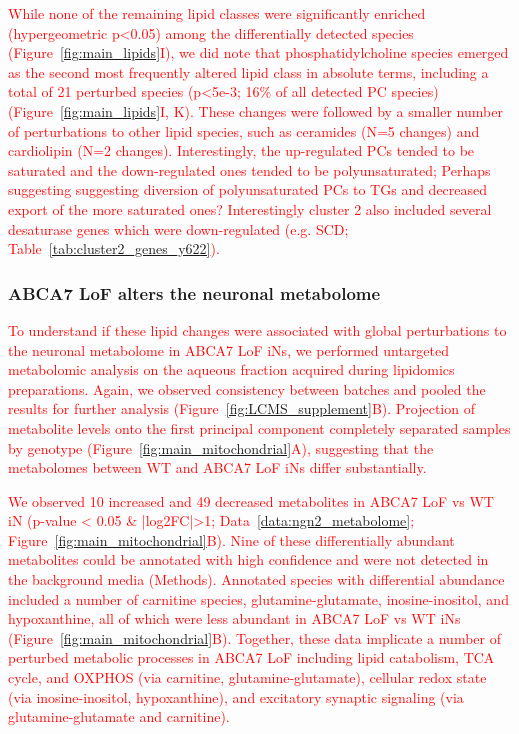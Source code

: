 \textcolor{red}{While none of the remaining lipid classes were significantly enriched (hypergeometric p<0.05) among the differentially detected species (Figure~\ref{fig:main_lipids}I), we did note that phosphatidylcholine species emerged as the second most frequently altered lipid class in absolute terms, including a total of 21 perturbed species (p<5e-3; 16\% of all detected PC species)(Figure~\ref{fig:main_lipids}I, K). These changes were followed by a smaller number of perturbations to other lipid species, such as ceramides (N=5 changes) and cardiolipin (N=2 changes). Interestingly, the up-regulated PCs tended to be saturated and the down-regulated ones tended to be polyunsaturated; Perhaps suggesting suggesting diversion of polyunsaturated PCs to TGs and decreased export of the more saturated ones? Interestingly cluster 2 also included several desaturase genes which were down-regulated (e.g. SCD; Table~\ref{tab:cluster2_genes_y622}).}

\subsubsection{ABCA7 LoF alters the neuronal metabolome}
\textcolor{red}{To understand if these lipid changes were associated with global perturbations to the neuronal metabolome in ABCA7 LoF iNs, we performed untargeted metabolomic analysis on the aqueous fraction acquired during lipidomics preparations. Again, we observed consistency between batches and pooled the results for further analysis (Figure~\ref{fig:LCMS_supplement}B). Projection of metabolite levels onto the first principal component completely separated samples by genotype (Figure~\ref{fig:main_mitochondrial}A), suggesting that the metabolomes between WT and ABCA7 LoF iNs differ substantially.} 

\textcolor{red}{We observed 10 increased and 49 decreased metabolites in ABCA7 LoF vs WT iN (p-value < 0.05 & |log2FC|>1; Data~\ref{data:ngn2_metabolome}; Figure~\ref{fig:main_mitochondrial}B). Nine of these differentially abundant metabolites could be annotated with high confidence and were not detected in the background media (Methods). Annotated species with differential abundance included a number of carnitine species, glutamine-glutamate, inosine-inositol, and hypoxanthine, all of which were less abundant in ABCA7 LoF vs WT iNs (Figure~\ref{fig:main_mitochondrial}B). Together, these data implicate a number of perturbed metabolic processes in ABCA7 LoF including lipid catabolism, TCA cycle, and OXPHOS (via carnitine\cite{Virmani2022-uc}, glutamine-glutamate\cite{Yoo2020-lh,noauthor_2023-sp}), cellular redox state (via inosine-inositol\cite{Chatree2020-qn,Basile2022-dd}, hypoxanthine\cite{Furuhashi2020-oi,Lee2018-tk}), and excitatory synaptic signaling (via glutamine-glutamate\cite{Morland2022-dk,noauthor_2021-cn,noauthor_2022-jz} and carnitine\cite{Inazu2008-wg,noauthor_2016-gp,Janiri1991-sx}).} 

